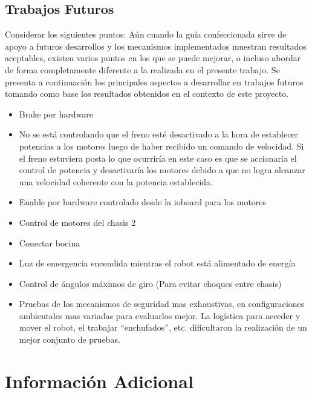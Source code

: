 \documentclass[withindex,glossary]{cam-thesis}
\begin{document}
\section{Trabajos Futuros}
Considerar los siguientes puntos:
Aún cuando la guía confeccionada sirve de apoyo a futuros desarrollos y los mecanismos implementados muestran resultados aceptables, existen varios puntos en los que se puede mejorar, o incluso abordar de forma completamente diferente a la realizada en el presente trabajo.
Se presenta a continuación los principales aspectos a desarrollar en trabajos futuros tomando como base los resultados obtenidos en el contexto de este proyecto.

\begin{itemize}
    \item Brake por hardware
    \item No se está controlando que el freno esté desactivado a la hora de establecer potencias a los motores luego de haber recibido un comando de velocidad. Si el freno estuviera posta lo que ocurriría en este caso es que se accionaría el control de potencia y desactivaría los motores debido a que no logra alcanzar una velocidad coherente con la potencia establecida.
    \item Enable por hardware controlado desde la ioboard para los motores
    \item Control de motores del chasis 2
    \item Conectar bocina
    \item Luz de emergencia encendida mientras el robot está alimentado de energía
    \item Control de ángulos máximos de giro (Para evitar choques entre chasis)
    \item Pruebas de los mecanismos de seguridad mas exhaustivas, en configuraciones ambientales mas variadas para evaluarlos mejor. La logística para acceder y mover el robot, el trabajar ``enchufados'', etc. dificultaron la realización de un mejor conjunto de pruebas.
\end{itemize}


\cleardoublepage
{}
{}

%




\appendix

\chapter{Información Adicional}


\printthesisindex

\listoffigures{}
\listoftables{}
\end{document}

